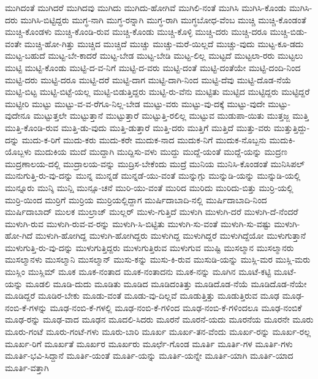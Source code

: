 {ಮುಗಿದಂತೆ
ಮುಗಿದರೆ
ಮುಗಿದವು
ಮುಗಿದು
ಮುಗಿದು-ಹೋಗಿವೆ
ಮುಗಿಲಿ-ನಂತೆ
ಮುಗಿಸಿ
ಮುಗಿಸಿ-ಕೊಂಡು
ಮುಗಿಸಿ-ದರು
ಮುಗಿಸಿ-ಬಿಟ್ಟಿದ್ದರು
ಮುಗ್ಧ-ನಾಗಿ
ಮುಗ್ಧ-ರನ್ನಾಗಿ
ಮುಗ್ಧ-ರಾಗಿ
ಮುಗ್ಧಬೋಧ-ವೆಂಬ
ಮುಚ್ಚಿ
ಮುಚ್ಚಿ-ಕೊಂಡಂತೆ
ಮುಚ್ಚಿ-ಕೊಂಡಳು
ಮುಚ್ಚಿ-ಕೊಂಡಿ-ರುವ
ಮುಚ್ಚಿ-ಕೊಂಡು
ಮುಚ್ಚಿ-ಕೊಳ್ಳಿ
ಮುಚ್ಚಿ-ದರು
ಮುಚ್ಚಿ-ದರೂ
ಮುಚ್ಚಿ-ಬಿಡು-ವಂತೇ
ಮುಚ್ಚಿ-ಹೋ-ಗಿತ್ತು
ಮುಚ್ಚಿದ
ಮುಚ್ಚಿದೆ
ಮುಚ್ಚು
ಮುಚ್ಚು-ಮರೆ-ಯಿಲ್ಲದೆ
ಮುಚ್ಚು-ವುದು
ಮುಟ್ಟ-ಕೂ-ಡದು
ಮುಟ್ಟ-ಬಹುದೆ
ಮುಟ್ಟ-ಬೇ-ಕಾದರೆ
ಮುಟ್ಟ-ಬೇಡ
ಮುಟ್ಟ-ಬೇಡಿ
ಮುಟ್ಟ-ಲಿಲ್ಲ
ಮುಟ್ಟದೆ
ಮುಟ್ಟಲಾ-ರರು
ಮುಟ್ಟಲು
ಮುಟ್ಟಿ
ಮುಟ್ಟಿ-ಕೊಂಡು
ಮುಟ್ಟಿ-ದ-ವ-ನಿಗೆ
ಮುಟ್ಟಿ-ದ-ವರು
ಮುಟ್ಟಿ-ದಂತೆ
ಮುಟ್ಟಿ-ದಂತೆಯೇ
ಮುಟ್ಟಿ-ದಂದಿ-ನಿಂದ
ಮುಟ್ಟಿ-ದರು
ಮುಟ್ಟಿ-ದರೂ
ಮುಟ್ಟಿ-ದರೆ
ಮುಟ್ಟಿ-ದಾಗ
ಮುಟ್ಟಿ-ದಾಗಿ-ನಿಂದ
ಮುಟ್ಟಿ-ದೆವು
ಮುಟ್ಟಿ-ದೊಡ-ನೆಯೆ
ಮುಟ್ಟಿ-ಬಿಟ್ಟ
ಮುಟ್ಟಿ-ಬಿಟ್ಟೆ-ಯಲ್ಲ
ಮುಟ್ಟಿ-ಬಿಡುತ್ತಿದ್ದರು
ಮುಟ್ಟಿ-ರು-ವೆನು
ಮುಟ್ಟಿತು
ಮುಟ್ಟಿದ
ಮುಟ್ಟಿದ್ದರು
ಮುಟ್ಟಿದ್ದರೆ
ಮುಟ್ಟೀರಿ
ಮುಟ್ಟು
ಮುಟ್ಟು-ವ-ವ-ರೆಗೂ-ನಿಲ್ಲ-ಬೇಡ
ಮುಟ್ಟು-ವರು
ಮುಟ್ಟು-ವು-ದಕ್ಕೆ
ಮುಟ್ಟು-ವುದೇ
ಮುಟ್ಟು-ವುದೇನೂ
ಮುಟ್ಟುತ್ತಲೇ
ಮುಟ್ಟುತ್ತಾನೆ
ಮುಟ್ಟುತ್ತಾರೆ
ಮುಟ್ಟುತ್ತಿ-ರಲಿಲ್ಲ
ಮುಟ್ಟುವ
ಮುಡುಪಾ-ಯಿತು
ಮುತ್ತಜ್ಜ
ಮುತ್ತಿ
ಮುತ್ತಿ-ಕೊಂಡಿ-ರುವ
ಮುತ್ತಿ-ಡು-ವುದು
ಮುತ್ತಿ-ಡುತ್ತಾರೆ
ಮುತ್ತಿ-ದರು
ಮುತ್ತಿಗೆ
ಮುತ್ತಿದೆ
ಮುತ್ತು-ವರು
ಮುತ್ತುತ್ತಿದ್ದು-ದನ್ನು
ಮುದು-ಕ-ರಿಗೆ
ಮುದು-ಕರು
ಮುದು-ಕರೇ
ಮುದುಕ-ನಾದ
ಮುದುಕ-ನಿಗೆ
ಮುದುಕ-ನೊಬ್ಬನು
ಮುದುಕಿ-ಯೊಬ್ಬಳು
ಮುದುಕಿಯ
ಮುದೆ
ಮುದ್ದಾಗಿ
ಮುದ್ದಿಸು-ವಳು
ಮುದ್ದು
ಮುದ್ದೆ-ಯಂತೆ
ಮುದ್ದೆ-ಯನ್ನು
ಮುದ್ರಣ
ಮುದ್ರಣಾಲಯ-ದಲ್ಲಿ
ಮುದ್ರಾಲಯ-ವನ್ನು
ಮುದ್ರಿಸ-ಬೇಕೆಂದು
ಮುದ್ರೆ
ಮುನಿಯ
ಮುನಿಸಿ-ಕೊಂಡಂತೆ
ಮುನಿಸಿಪಲ್
ಮುನುಗುತ್ತಿ-ರು-ವು-ದನ್ನು
ಮುನ್ನ
ಮುನ್ನಡೆ
ಮುನ್ನಡೆ-ಯು-ವಂತೆ
ಮುನ್ನುಗ್ಗು
ಮುನ್ನುಡಿ-ಯನ್ನು
ಮುನ್ನುಡಿ-ಯಲ್ಲಿ
ಮುನ್ನೂರು
ಮುನ್ಶಿ
ಮುನ್ಷಿ
ಮುನ್ಸೂ-ಚನೆ
ಮುರಿ-ಯು-ವಂತೆ
ಮುರಿದ
ಮುರಿದು
ಮುರಿದು-ಬಿತ್ತು
ಮುರ್ರಿ-ಯಲ್ಲಿ
ಮುರ್ರಿ-ಯಿಂದ
ಮುರ್ರಿಗೆ
ಮುರ್ರಿಯ
ಮುರ್ರಿಯಲ್ಲಿದ್ದಾಗ
ಮುರ್ಷಿದಾಬಾದಿ-ನಲ್ಲಿ
ಮುರ್ಷಿದಾಬಾದಿ-ನಿಂದ
ಮುರ್ಷಿದಾಬಾದ್
ಮುಲಕ
ಮುಲ್ರಾಜ್
ಮುಲ್ಲರ್
ಮುಳು-ಗುತ್ತಿದೆ
ಮುಳುಗಿ
ಮುಳುಗಿ-ದರೆ
ಮುಳುಗಿ-ದೆ-ನೆಂದರೆ
ಮುಳುಗಿ-ರುವ
ಮುಳುಗಿ-ರುವ-ವ-ರನ್ನು
ಮುಳುಗಿ-ಸಿ-ಬಿಟ್ಟಿತು
ಮುಳುಗಿ-ಸು-ವಂತೆ
ಮುಳುಗಿ-ಸು-ವಷ್ಟು
ಮುಳುಗಿ-ಹೋ-ಗಿದೆ
ಮುಳುಗಿ-ಹೋಗಿದ್ದ
ಮುಳುಗಿ-ಹೋಗಿದ್ದರು
ಮುಳುಗಿದ್ದ
ಮುಳುಗಿದ್ದರೆ
ಮುಳುಗಿದ್ದೆಯೋ
ಮುಳುಗುತ್ತಾನೆ
ಮುಳುಗುತ್ತಿ-ರು-ವು-ದನ್ನು
ಮುಳುಗುತ್ತಿದ್ದರು
ಮುಳುಗುತ್ತಿರುವ
ಮುಳುಗುವ
ಮುಷ್ಟಿ
ಮುಸಲ್ಮಾನ
ಮುಸಲ್ಮಾನರು
ಮುಸಲ್ಮಾನಳು
ಮುಸಲ್ಮಾನಿ
ಮುಸಲ್ಮಾನ್
ಮುಸು-ಕನ್ನು
ಮುಸು-ಕಿ-ರುವ
ಮುಸುಡಿ-ಯನ್ನು
ಮುಸ್ಲಿ-ಮರ
ಮುಸ್ಲಿ-ಮರು
ಮುಸ್ಲಿಂ
ಮುಸ್ಲಿಮ್
ಮೂಕ
ಮೂಕ-ನಂತಾದ
ಮೂಕ-ನಂತಾದನು
ಮೂಕ-ನನ್ನು
ಮೂಗಿನ
ಮೂಟೆ-ಕಟ್ಟಿ
ಮೂಟೆ-ಯನ್ನು
ಮೂಡಲಿ
ಮೂಡಿ-ದುದು
ಮೂಡಿತು
ಮೂಡಿದ
ಮೂಡಿದಂತಿತ್ತು
ಮೂಡಿದೊಡ-ನೆಯೆ
ಮೂಡಿದೊಡ-ನೆಯೇ
ಮೂಡಿದ್ದರೆ
ಮೂಡಿರ-ಬೇಕು
ಮೂಡು-ವಂತೆ
ಮೂಡು-ವು-ದಿಲ್ಲವೆ
ಮೂಡುತ್ತಿತ್ತು
ಮೂಡುತ್ತಿರುವ
ಮೂಢ
ಮೂಢ-ನಂಬಿ-ಕೆ-ಗಳನ್ನು
ಮೂಢ-ನಂಬಿ-ಕೆ-ಗಳಲ್ಲಿ
ಮೂಢ-ನಂಬಿ-ಕೆ-ಗಳಿಂದ
ಮೂಢ-ನಂಬಿ-ಕೆ-ಗಳಿಂದಲೂ
ಮೂಢ-ನಂಬಿಕೆ
ಮೂಢ-ರನ್ನು
ಮೂಢ-ವಾದ
ಮೂಢನ
ಮೂದಲಿ-ಸಿದರು
ಮೂರನೆ
ಮೂರನೆ-ಯದು
ಮೂರನೆಯ
ಮೂರನೇ
ಮೂರು
ಮೂರು-ಗಂಟೆ
ಮೂರು-ಗಂಟೆ-ಗಳು
ಮೂರು-ಬಾರಿ
ಮೂರ್ಖ
ಮೂರ್ಖ-ತನ-ವೆಂದು
ಮೂರ್ಖ-ರನ್ನು
ಮೂರ್ಖ-ರಲ್ಲ
ಮೂರ್ಖ-ರಿಗೆ
ಮೂರ್ಖತೆ
ಮೂರ್ಖರ
ಮೂರ್ಖರು
ಮೂರ್ಛೆ-ಗೊಂಡ
ಮೂರ್ತಿ
ಮೂರ್ತಿ-ಗಳ
ಮೂರ್ತಿ-ಗಳು
ಮೂರ್ತಿ-ಭವಿ-ಸಿದ್ದಾನೆ
ಮೂರ್ತಿ-ಯಂತೆ
ಮೂರ್ತಿ-ಯನ್ನು
ಮೂರ್ತಿ-ಯನ್ನೇ
ಮೂರ್ತಿ-ಯಾಗಿ
ಮೂರ್ತಿ-ಯಾದ
ಮೂರ್ತಿ-ವತ್ತಾಗಿ
}
